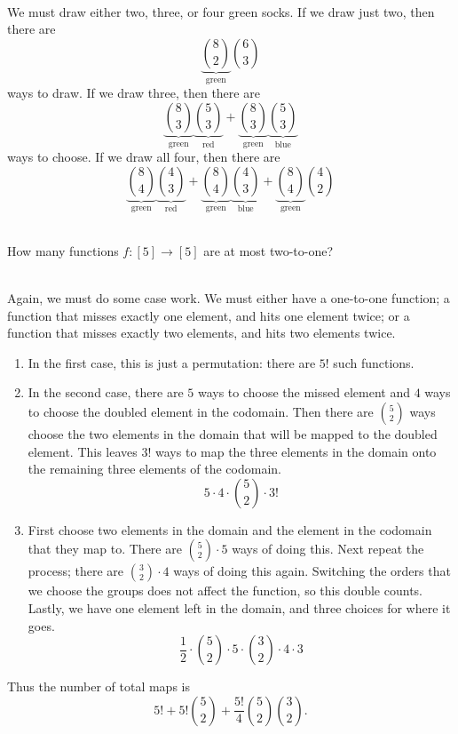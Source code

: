 \documentclass{article}
\newenvironment{problem}[2][Problem]{\begin{trivlist}
\item[\hskip \labelsep {\bfseries #1}\hskip \labelsep {\bfseries #2.}]}{\end{trivlist}}
\newenvironment{solution}[1][Solution.]{\begin{trivlist}
\item[\hskip \labelsep {\bfseries #1}]}{\end{trivlist}}
\begin{document}
\begin{solution} \text{} \\
  We must draw either two, three, or four green socks.
  If we draw just two, then there are \[
    \underbrace{\binom{8}{2}}_\text{green}
    \binom{6}{3}
  \] ways to draw.
  If we draw three, then there are \[
    \underbrace{\binom{8}{3}}_\text{green}
    \underbrace{\binom{5}{3}}_\text{red} +
    \underbrace{\binom{8}{3}}_\text{green}
    \underbrace{\binom{5}{3}}_\text{blue}
  \] ways to choose.
  If we draw all four, then there are \[
    \underbrace{\binom{8}{4}}_\text{green}
    \underbrace{\binom{4}{3}}_\text{red} +
    \underbrace{\binom{8}{4}}_\text{green}
    \underbrace{\binom{4}{3}}_\text{blue} +
    \underbrace{\binom{8}{4}}_\text{green}
    \binom{4}{2}
  \]
\end{solution}

\begin{problem}{2 (l)} \text{} \\
  How many functions $f\colon [5]\rightarrow[5]$ are at most two-to-one?
\end{problem}

\begin{solution} \text{} \\
  Again, we must do some case work. We must either have a one-to-one function;
  a function that misses exactly one element, and hits one element twice;
  or a function that misses exactly two elements, and hits two elements twice.
  \begin{enumerate}
    \item In the first case, this is just a permutation: there are $5!$ such functions.
    \item In the second case, there are $5$ ways to choose the missed element and $4$
      ways to choose the doubled element in the codomain. Then there are
      $\binom{5}{2}$ ways choose the two elements in the domain that will be mapped
      to the doubled element. This leaves $3!$ ways to map the three elements in the
      domain onto the remaining three elements of the codomain. \[
        5\cdot4\cdot\binom{5}{2}\cdot3!
      \]
    \item First choose two elements in the domain and the element in the
    codomain that they map to. There are $\binom{5}{2}\cdot5$ ways of doing this.
    Next repeat the process; there are $\binom{3}{2}\cdot4$ ways of doing this
    again. Switching the orders that we choose the groups does not affect the
    function, so this double counts. Lastly, we have one element left in the
    domain, and three choices for where it goes. \[
      \frac{1}{2}\cdot\binom{5}{2}\cdot5\cdot\binom{3}{2}\cdot4\cdot3
    \]
  \end{enumerate}
  Thus the number of total maps is \[
    5! + 5!\binom52 + \frac{5!}{4}\binom52\binom32.
  \]
\end{solution}
\end{document}
